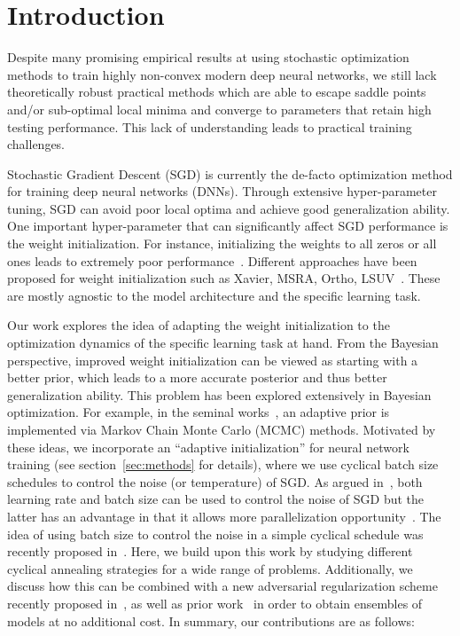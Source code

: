 \section{Introduction}\label{sec:intro}
Despite many promising empirical results at using stochastic optimization methods to train highly non-convex modern deep neural networks, we still lack theoretically robust practical methods which are able to escape saddle points and/or sub-optimal local minima and converge to parameters that retain high testing performance.  
This lack of understanding leads to practical training challenges.

Stochastic Gradient Descent (SGD) is currently the de-facto optimization method for training
deep neural networks (DNNs). 
Through 
extensive hyper-parameter tuning, SGD 
can avoid poor local optima and achieve good generalization ability.
One important hyper-parameter that can
significantly affect SGD performance is the weight initialization. For instance, initializing the 
weights to all zeros or all ones leads to extremely poor performance~\cite{xu2017second}.
Different approaches have been proposed for weight initialization such
as Xavier, MSRA, Ortho, LSUV~\cite{glorot2010understanding,he2015delving,saxe2013exact,mishkin2015all}.
These are mostly agnostic to the model architecture and the specific learning task.

Our work explores the idea of adapting the weight initialization to the optimization dynamics of the specific learning task at hand.
From the Bayesian perspective, improved weight initialization can be viewed
as starting with a better prior, which leads to a more accurate
posterior and thus better generalization ability. 
This problem has been explored extensively in Bayesian optimization. For example, in the seminal works~\cite{hu2017adaptive,roberts2009examples}, an adaptive
prior is implemented via Markov Chain Monte Carlo (MCMC) methods. 
Motivated by these ideas, we incorporate an ``adaptive initialization'' for neural network training (see section~\ref{sec:methods} for details), where we use cyclical batch size schedules to control the noise (or temperature) of SGD.
As argued in~\cite{smith2018bayesian}, both learning rate and batch size can be used to control the noise of SGD but the latter
has an advantage in that it allows more parallelization opportunity~\cite{gholami2017integrated}.
The idea of using batch size to control the noise in a simple cyclical schedule was recently proposed in~\cite{jastrzkebski2017three}.
Here, we build upon this work by studying different cyclical annealing strategies for a wide
range of problems. Additionally, we discuss how this can be combined with a new adversarial regularization scheme recently proposed in~\cite{yao2018large}, as well as prior work~\citep{huang2017snapshot} in order to obtain ensembles of models at no
additional cost.
In summary, our contributions are as follows:

